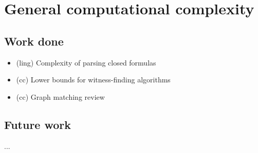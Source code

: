 \documentclass{article}
\begin{document}
\appendix

\section{General computational complexity}

\subsection{Work done}

\begin{itemize}
\item (ling) Complexity of parsing closed formulas
\item (cc) Lower bounds for witness-finding algorithms
\item (cc) Graph matching review
\end{itemize}

\subsection{Future work}

...
\end{document}
